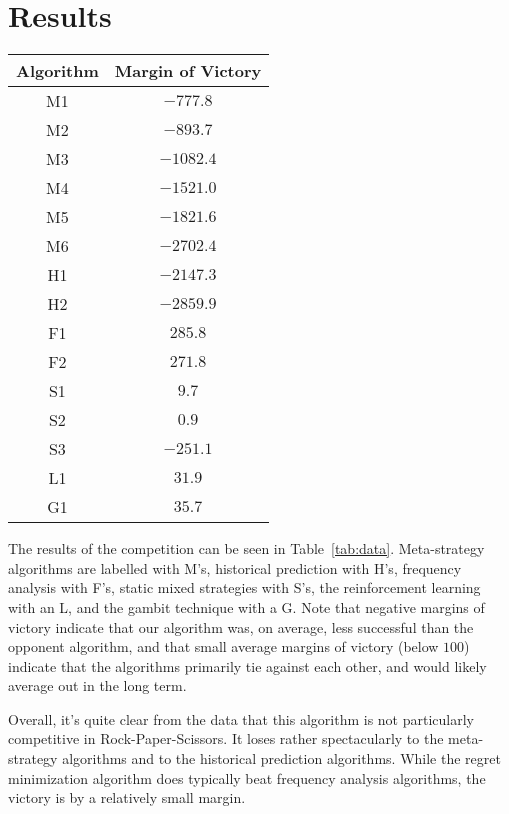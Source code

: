 
\section{Results}
\label{sec:results}

\begin{table*}[ht]
  \centering
  \begin{tabular}{|c|c|}
    \hline \hline %
    Algorithm & Margin of Victory\\
    \hline %
    M1& $-777.8$\\
    M2& $-893.7$\\
    M3& $-1082.4$\\
    M4& $-1521.0$\\
    M5& $-1821.6$\\
    M6& $-2702.4$\\
    \hline
    H1& $-2147.3$\\
    H2& $-2859.9$\\
    \hline
    F1& $285.8$\\
    F2& $271.8$\\
    \hline
    S1& $9.7$\\
    S2& $0.9$\\
    S3& $-251.1$\\
    \hline
    L1& $31.9$\\
    \hline
    G1& $35.7$\\
    \hline \hline
  \end{tabular}
  
  \caption{Regret-minimization algorithm margin of victory against other algorithms.}
  \label{tab:data}
\end{table*}

The results of the competition can be seen in Table~\ref{tab:data}.  Meta-strategy algorithms are labelled with M's, historical prediction with H's, frequency analysis with F's, static mixed strategies with S's, the reinforcement learning with an L, and the gambit technique with a G.  Note that negative margins of victory indicate that our algorithm was, on average, less successful than the opponent algorithm, and that small average margins of victory (below $100$) indicate that the algorithms primarily tie against each other, and would likely average out in the long term.

Overall, it's quite clear from the data that this algorithm is not particularly competitive in Rock-Paper-Scissors.  It loses rather spectacularly to the meta-strategy algorithms and to the historical prediction algorithms.  While the regret minimization algorithm does typically beat frequency analysis algorithms, the victory is by a relatively small margin.  

